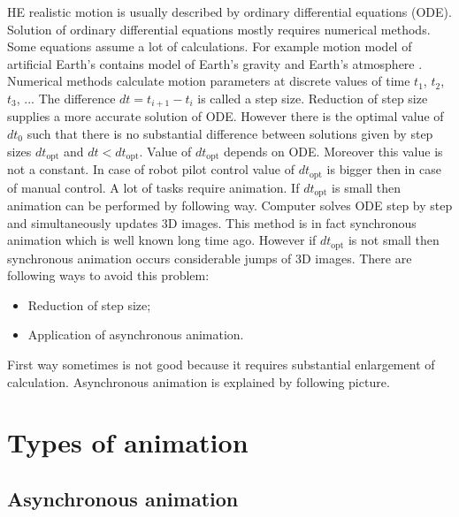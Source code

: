 \documentclass[10pt,journal,compsoc]{IEEEtran}
\begin{document}
	
	HE realistic motion is usually described by ordinary differential equations (ODE). Solution of ordinary differential equations mostly requires {numerical methods}. Some equations assume a lot of calculations. For example motion model of artificial Earth's contains model of {Earth's gravity} and {Earth's atmosphere }. Numerical methods calculate motion parameters at discrete values of time $t_1$, $t_2$,$t_3$, ... The difference $dt = t_{i+1}-t_i$ is called a step size. Reduction of step size supplies a more accurate solution of ODE. However there is the optimal value of $dt_0$ such that there is no substantial difference between solutions given by step sizes $dt_{\text{opt}}$ and $dt < dt_{\text{opt}}$. Value of $dt_{\text{opt}}$ depends on ODE. Moreover this value is not a constant. In case of robot pilot control value of $dt_{\text{opt}}$ is bigger then in case of manual control. A lot of tasks require animation. If $dt_{\text{opt}}$ is small then animation can be performed by following way. Computer solves ODE step by step and simultaneously updates 3D images. This method is in fact synchronous animation which is well known long time ago. However if $dt_{\text{opt}}$ is not small then synchronous animation occurs considerable jumps of 3D images. There are following ways to avoid this problem: 
	\begin{itemize}
		\item Reduction of step size; 
		\item Application of asynchronous animation.
	\end{itemize}
First way sometimes is not good because it requires substantial enlargement of calculation. Asynchronous animation is explained by following picture. 
\section{Types of animation}	
\subsection{Asynchronous animation}
\end{document}
